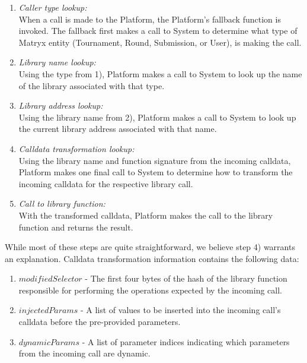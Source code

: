 \documentclass[a4paper, 10pt, conference]{ieeeconf}      %
\begin{document}
\begin{enumerate}
    \item \textit{Caller type lookup:} \\ When a call is made to the Platform, the Platform’s fallback function is invoked. The fallback first makes a call to System to determine what type of Matryx entity (Tournament, Round, Submission, or User), is making the call.
    \item \textit{Library name lookup:} \\ Using the type from 1), Platform makes a call to System to look up the name of the library associated with that type.
    \item \textit{Library address lookup:} \\ Using the library name from 2), Platform makes a call to System to look up the current library address associated with that name.
    \item \textit{Calldata transformation lookup:} \\ Using the library name and function signature from the incoming calldata, Platform makes one final call to System to determine how to transform the incoming calldata for the respective library call.
    \item \textit{Call to library function:} \\ With the transformed calldata, Platform makes the call to the library function and returns the result.
\end{enumerate}
\bigskip

While most of these steps are quite straightforward, we believe step 4) warrants an explanation. Calldata transformation information contains the following data:

\begin{enumerate}
\item $modifiedSelector$ - The first four bytes of the hash of the library function responsible for performing the operations expected by the incoming call.
\item $injectedParams$ - A list of values to be inserted into the incoming call's calldata before the pre-provided parameters.
\item $dynamicParams$ - A list of parameter indices indicating which parameters from the incoming call are dynamic.
\end{enumerate}
\end{document}
